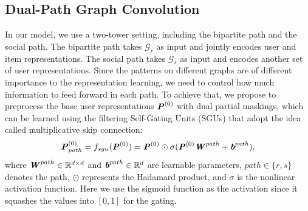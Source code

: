 \documentclass[letterpaper]{article} %
\begin{document}
\subsection{Dual-Path Graph Convolution}
In our model, we use a two-tower setting, including the bipartite path and the social path. The bipartite path takes $\mathcal{G}_r$ as input and jointly encodes user and item representations. The social path takes $\mathcal{G}_s$ as input and encodes another set of user representations. Since the patterns on different graphs are of different importance to the representation learning, we need to control how much information to feed forward in each path. To achieve that, we propose to preprocess the base user representations $\textbf{\textit{P}}^{(0)}$ with dual partial maskings, which can be learned using the filtering Self-Gating Units (SGUs) \cite{SGU} that adopt the idea called multiplicative skip connection:
\begin{equation}
    \textbf{\textit{P}}^{(0)}_{path} = f_{sgu}(\textbf{\textit{P}}^{(0)}) = \textbf{\textit{P}}^{(0)} \odot \sigma (\textbf{\textit{P}}^{(0)}\textbf{\textit{W}}^{path} + \textbf{\textit{b}}^{path}),
\end{equation}
where $\textbf{\textit{W}}^{path} \in \mathbb{R}^{d\times d}$ and $\textbf{\textit{b}}^{path} \in \mathbb{R}^{d}$ are learnable parameters, $path \in \{r,s\}$ denotes the path, $\odot$ represents the Hadamard product, and $\sigma$ is the nonlinear activation function. Here we use the sigmoid function as the activation since it squashes the values into $[0,1]$ for the gating.
\end{document}
